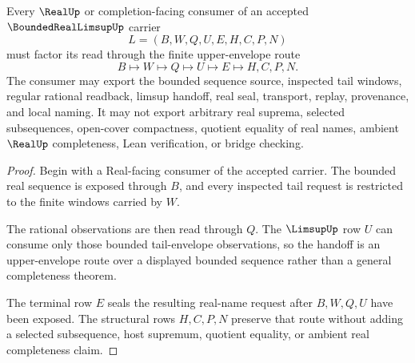 \begin{theorem}
\label{thm:bounded-real-limsup-real-handoff}
Every $\RealUp$ or completion-facing consumer of an accepted $\BoundedRealLimsupUp$ carrier
$$
L=(B,W,Q,U,E,H,C,P,N)
$$
must factor its read through the finite upper-envelope route
$$
B \longmapsto W \longmapsto Q \longmapsto U \longmapsto E \longmapsto H,C,P,N .
$$
The consumer may export the bounded sequence source, inspected tail windows, regular rational readback, limsup handoff, real seal, transport, replay, provenance, and local naming. It may not export arbitrary real suprema, selected subsequences, open-cover compactness, quotient equality of real names, ambient $\RealUp$ completeness, Lean verification, or bridge checking.
\end{theorem}
\begin{proof}
Begin with a Real-facing consumer of the accepted carrier. The bounded real sequence is exposed through $B$, and every inspected tail request is restricted to the finite windows carried by $W$.

The rational observations are then read through $Q$. The $\LimsupUp$ row $U$ can consume only those bounded tail-envelope observations, so the handoff is an upper-envelope route over a displayed bounded sequence rather than a general completeness theorem.

The terminal row $E$ seals the resulting real-name request after $B,W,Q,U$ have been exposed. The structural rows $H,C,P,N$ preserve that route without adding a selected subsequence, host supremum, quotient equality, or ambient real completeness claim.
\end{proof}




